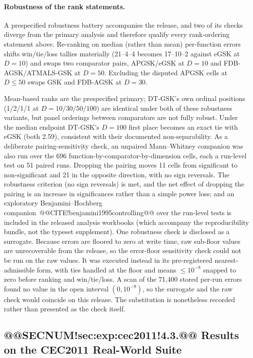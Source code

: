 \documentclass[10pt,a4paper]{article}
\newcommand{\dtgsk}{DT-GSK}
\newcommand{\atmals}{ATMALS-GSK}
\newcommand{\apgsk}{APGSK}
\newcommand{\fdbagsk}{FDB-AGSK}
\newcommand{\egsk}{eGSK}
\begin{document}
\paragraph{Robustness of the rank statements.}
A prespecified robustness battery accompanies the release, and two
of its checks diverge from the primary analysis and therefore qualify
every rank-ordering statement above. Re-ranking on median (rather
than mean) per-function errors shifts win/tie/loss tallies materially
(21--4--4 becomes 17--10--2 against \egsk{} at $D = 10$) and
swaps two comparator pairs, \apgsk{}/\egsk{} at $D = 10$ and
\fdbagsk{}/\atmals{} at $D = 50$. Excluding the disputed APGSK cells
at $D \leq 50$ swaps GSK and \fdbagsk{} at $D = 30$.

Mean-based ranks are the prespecified primary; \dtgsk{}'s own
ordinal positions (1/2/1/1 at $D = 10/30/50/100$) are identical under
both of these robustness variants, but panel orderings between comparators are not fully
robust. Under the median endpoint \dtgsk{}'s $D = 100$ first place becomes
an exact tie with \egsk{} (both 2.59), consistent with their documented
non-separability. As a deliberate pairing-sensitivity check, an unpaired Mann--Whitney companion was also run over the
696 function-by-comparator-by-dimension cells, each a run-level test on 51
paired runs. Dropping the pairing moves 11 cells from significant to
non-significant and 21 in the opposite direction, with no sign reversals. The
robustness criterion (no sign reversals) is met, and the net effect of
dropping the pairing is an increase in significances rather than a
simple power loss; and an
exploratory Benjamini--Hochberg
companion~@@CITE!benjamini1995controlling@@ over the run-level tests is
included in the released analysis workbooks (which accompany the
reproducibility bundle, not the typeset supplement).
One robustness check is disclosed as a surrogate. Because errors are floored
to zero at write time, raw sub-floor values are unrecoverable from the
release, so the error-floor sensitivity check could not be run on the raw
values. It was executed instead in its pre-registered nearest-admissible form,
with ties handled at the floor and means $\le 10^{-8}$ snapped to zero before
ranking and win/tie/loss. A scan of the 71,400 stored per-run errors found no
value in the open interval $(0, 10^{-8})$, so the surrogate and the raw check
would coincide on this release. The substitution is nonetheless recorded rather
than presented as the check itself.



\subsection{@@SECNUM!sec:exp:cec2011!4.3.@@ Results on the CEC2011 Real-World Suite}\label{sec:exp:cec2011}
\end{document}
